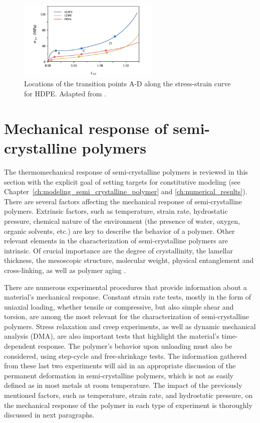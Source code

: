 \begin{figure}[htbp]
	\centering
	\includegraphics[width=0.6\textwidth]{figures/stress_strain_curve_strobl}
	\caption{Locations of the transition points A-D along the stress-strain curve for HDPE. Adapted from \cite{hissNetworkStretchingSlip1999}.}
\label{fig:stress_strain_curve_strobl}
\end{figure}

\section{Mechanical response of semi-crystalline polymers}

The thermomechanical response of semi-crystalline polymers is reviewed in this section with the explicit goal of setting targets for constitutive modeling (see Chapter~\ref{ch:modeling_semi_crystalline_polymer} and \ref{ch:numerical_results}).
There are several factors affecting the mechanical response of semi-crystalline polymers.
Extrinsic factors, such as temperature, strain rate, hydrostatic pressure, chemical nature of the environment (the presence of water, oxygen, organic solvents, etc.) are key to describe the behavior of a polymer.
Other relevant elements in the characterization of semi-crystalline polymers are intrinsic.
Of crucial importance are the degree of crystallinity, the lamellar thickness, the mesoscopic structure, molecular weight, physical entanglement and cross-linking, as well as polymer aging \citep{ayoubEffectsCrystalContent2011, serbanTensilePropertiesSemicrystalline2013, callister2014materials, cundiffModelingViscoplasticBehavior2022}.

There are numerous experimental procedures that provide information about a material's mechanical response.
Constant strain rate tests, mostly in the form of uniaxial loading, whether tensile or compressive, but also simple shear and torsion, are among the most relevant for the characterization of semi-crystalline polymers.
Stress relaxation and creep experiments, as well as dynamic mechanical analysis (DMA), are also important tests that highlight the material's time-dependent response.
The polymer's behavior upon unloading must also be considered, using step-cycle and free-shrinkage tests.
The information gathered from these last two experiments will aid in an appropriate discussion of the permanent deformation in semi-crystalline polymers, which is not as easily defined as in most metals at room temperature.
The impact of the previously mentioned factors, such as temperature, strain rate, and hydrostatic pressure, on the mechanical response of the polymer in each type of experiment is thoroughly discussed in next paragraphs.

